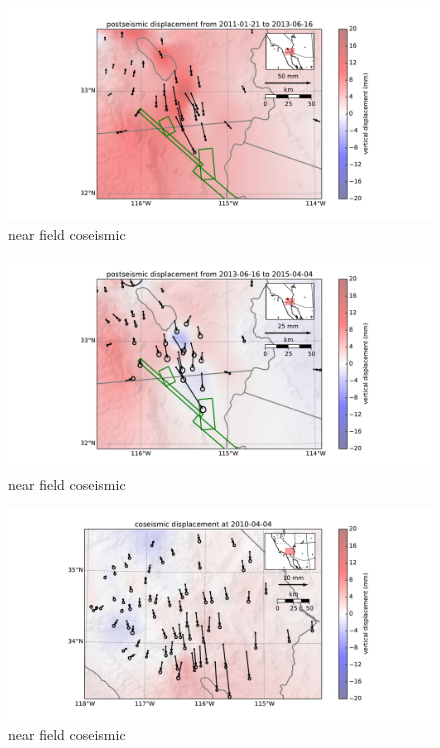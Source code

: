 \documentclass[12pt]{article}
\begin{document}
\begin{figure}
\includegraphics[scale=0.6]{Figures/near_field_data_3}
\centering 
\caption{near field coseismic}
\label{nearfield3}
\end{figure}

\begin{figure}
\includegraphics[scale=0.6]{Figures/near_field_data_4}
\centering 
\caption{near field coseismic}
\label{nearfield4}
\end{figure}

\begin{figure}
\includegraphics[scale=0.6]{Figures/far_field_data_1}
\centering 
\caption{near field coseismic}
\label{farfield1}
\end{figure}
\end{document}
